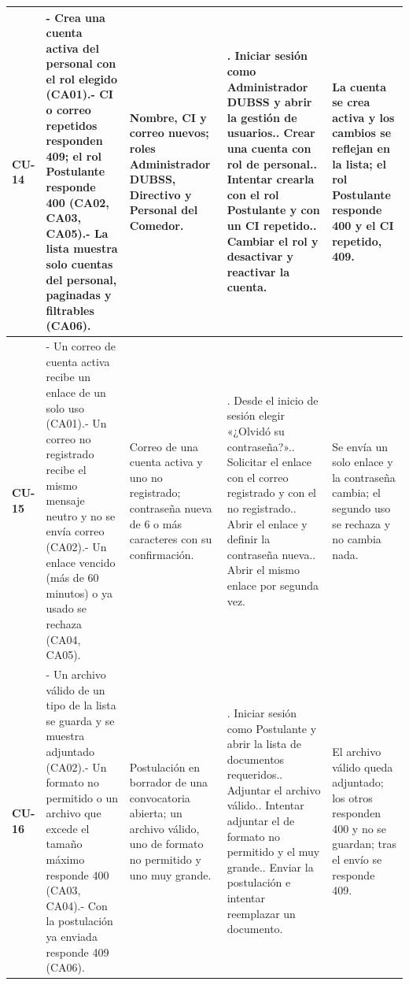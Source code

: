 {\begin{longtable}{@{}>{\raggedright\arraybackslash}p{1.2cm}>{\raggedright\arraybackslash}p{3.7cm}>{\raggedright\arraybackslash}p{3.0cm}>{\raggedright\arraybackslash}p{4.4cm}>{\raggedright\arraybackslash}p{3.4cm}@{}}
\midrule
\textbf{CU-14} & - Crea una cuenta activa del personal con el rol elegido (CA01).\newline - CI o correo repetidos responden 409; el rol Postulante responde 400 (CA02, CA03, CA05).\newline - La lista muestra solo cuentas del personal, paginadas y filtrables (CA06). & Nombre, CI y correo nuevos; roles Administrador DUBSS, Directivo y Personal del Comedor. & 1. Iniciar sesión como Administrador DUBSS y abrir la gestión de usuarios.\newline 2. Crear una cuenta con rol de personal.\newline 3. Intentar crearla con el rol Postulante y con un CI repetido.\newline 4. Cambiar el rol y desactivar y reactivar la cuenta. & La cuenta se crea activa y los cambios se reflejan en la lista; el rol Postulante responde 400 y el CI repetido, 409. \\
\midrule
\textbf{CU-15} & - Un correo de cuenta activa recibe un enlace de un solo uso (CA01).\newline - Un correo no registrado recibe el mismo mensaje neutro y no se envía correo (CA02).\newline - Un enlace vencido (más de 60 minutos) o ya usado se rechaza (CA04, CA05). & Correo de una cuenta activa y uno no registrado; contraseña nueva de 6 o más caracteres con su confirmación. & 1. Desde el inicio de sesión elegir «¿Olvidó su contraseña?».\newline 2. Solicitar el enlace con el correo registrado y con el no registrado.\newline 3. Abrir el enlace y definir la contraseña nueva.\newline 4. Abrir el mismo enlace por segunda vez. & Se envía un solo enlace y la contraseña cambia; el segundo uso se rechaza y no cambia nada. \\
\midrule
\textbf{CU-16} & - Un archivo válido de un tipo de la lista se guarda y se muestra adjuntado (CA02).\newline - Un formato no permitido o un archivo que excede el tamaño máximo responde 400 (CA03, CA04).\newline - Con la postulación ya enviada responde 409 (CA06). & Postulación en borrador de una convocatoria abierta; un archivo válido, uno de formato no permitido y uno muy grande. & 1. Iniciar sesión como Postulante y abrir la lista de documentos requeridos.\newline 2. Adjuntar el archivo válido.\newline 3. Intentar adjuntar el de formato no permitido y el muy grande.\newline 4. Enviar la postulación e intentar reemplazar un documento. & El archivo válido queda adjuntado; los otros responden 400 y no se guardan; tras el envío se responde 409. \\

\end{longtable}}
